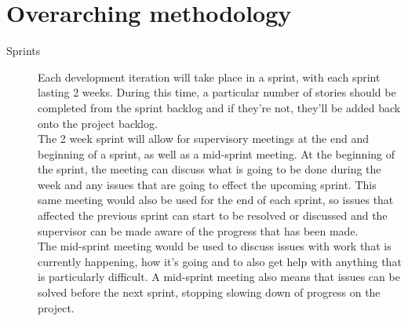 \documentclass[11pt,fleqn,twoside]{article}
\begin{document}
\section{Overarching methodology}
\begin{description}
  \item[Sprints]
    Each development iteration will take place in a sprint, with each sprint lasting 2 weeks. During this time, a particular number of stories should be completed from the sprint backlog and if they're not, they'll be added back onto the project backlog.\\
    
   The 2 week sprint will allow for supervisory meetings at the end and beginning of a sprint, as well as a mid-sprint meeting. At the beginning of the sprint, the meeting can discuss what is going to be done during the week and any issues that are going to effect the upcoming sprint. This same meeting would also be used for the end of each sprint, so issues that affected the previous sprint can start to be resolved or discussed and the supervisor can be made aware of the progress that has been made.\\
   
   The mid-sprint meeting would be used to discuss issues with work that is currently happening, how it's going and to also get help with anything that is particularly difficult. A mid-sprint meeting also means that issues can be solved before the next sprint, stopping slowing down of progress on the project.\\
   

\end{description}
\end{document}
